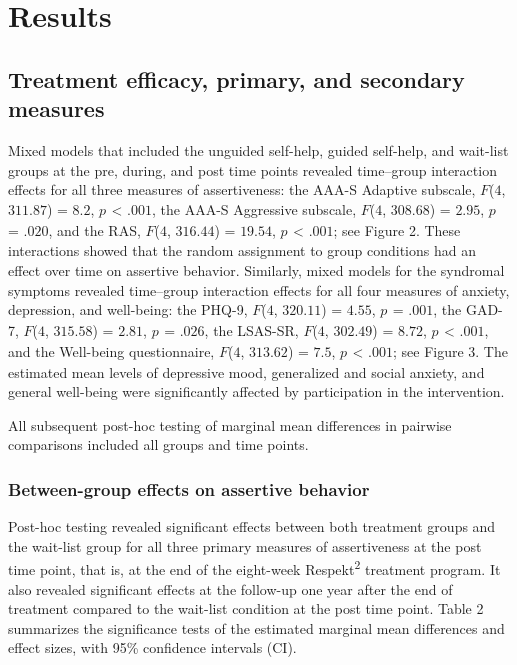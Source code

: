 \documentclass[3p]{elsarticle} %
\begin{document}
\hypertarget{results}{%
\section{Results}\label{results}}

\hypertarget{treatment-efficacy-primary-and-secondary-measures}{%
\subsection{Treatment efficacy, primary, and secondary
measures}\label{treatment-efficacy-primary-and-secondary-measures}}

Mixed models that included the unguided self-help, guided self-help, and
wait-list groups at the pre, during, and post time points revealed
time--group interaction effects for all three measures of assertiveness:
the AAA-S Adaptive subscale, \(F\)(\(4\), \(311.87\)) = \(8.2\),
\(p_{ }\) \textless{} \(.001\), the AAA-S Aggressive subscale,
\(F\)(\(4\), \(308.68\)) = \(2.95\), \(p_{ }\) = \(.020\), and the RAS,
\(F\)(\(4\), \(316.44\)) = \(19.54\), \(p_{ }\) \textless{} \(.001\);
see Figure 2. These interactions showed that the random assignment to
group conditions had an effect over time on assertive behavior.
Similarly, mixed models for the syndromal symptoms revealed time--group
interaction effects for all four measures of anxiety, depression, and
well-being: the PHQ-9, \(F\)(\(4\), \(320.11\)) = \(4.55\), \(p_{ }\) =
\(.001\), the GAD-7, \(F\)(\(4\), \(315.58\)) = \(2.81\), \(p_{ }\) =
\(.026\), the LSAS-SR, \(F\)(\(4\), \(302.49\)) = \(8.72\), \(p_{ }\)
\textless{} \(.001\), and the Well-being questionnaire, \(F\)(\(4\),
\(313.62\)) = \(7.5\), \(p_{ }\) \textless{} \(.001\); see Figure 3. The
estimated mean levels of depressive mood, generalized and social
anxiety, and general well-being were significantly affected by
participation in the intervention.

All subsequent post-hoc testing of marginal mean differences in pairwise
comparisons included all groups and time points.

\hypertarget{between-group-effects-on-assertive-behavior}{%
\subsubsection{Between-group effects on assertive
behavior}\label{between-group-effects-on-assertive-behavior}}

Post-hoc testing revealed significant effects between both treatment
groups and the wait-list group for all three primary measures of
assertiveness at the post time point, that is, at the end of the
eight-week Respekt\textsuperscript{2} treatment program. It also
revealed significant effects at the follow-up one year after the end of
treatment compared to the wait-list condition at the post time point.
Table 2 summarizes the significance tests of the estimated marginal mean
differences and effect sizes, with 95\% confidence intervals (CI).
\end{document}
